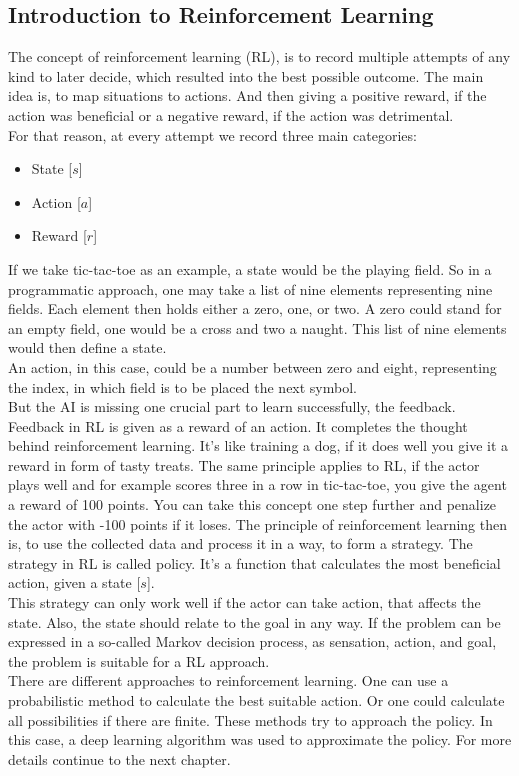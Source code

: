 \documentclass[12pt]{article}
\begin{document}
\subsection{Introduction to Reinforcement Learning}
The concept of \gls{reinforcement learning} (RL), is to record multiple attempts of any kind to later decide, which resulted into the best possible outcome. The main idea is, to map situations to actions. And then giving a positive \gls{reward}, if the action was beneficial or a negative \gls{reward}, if the action was detrimental. \cite{suttonreinforcement} \\
For that reason, at every attempt we record three main categories: 
\begin{itemize}
    \item State [$s$]
    \item Action [$a$]
    \item Reward [$r$]
\end{itemize}
If we take tic-tac-toe as an example, a \gls{state} would be the playing field. So in a programmatic approach, one may take a list of nine elements representing nine fields. Each element then holds either a zero, one, or two. A zero could stand for an empty field, one would be a cross and two a naught. This list of nine elements would then define a \gls{state}. \\
An action, in this case, could be a number between zero and eight, representing the index, in which field is to be placed the next symbol.\\
But the \gls{AI} is missing one crucial part to learn successfully, the feedback. Feedback in RL is given as a \gls{reward} of an action. It completes the thought behind reinforcement learning. It's like training a dog, if it does well you give it a \gls{reward} in form of tasty treats. The same principle applies to RL, if the actor plays well and for example scores three in a row in tic-tac-toe, you give the agent a \gls{reward} of 100 points. You can take this concept one step further and penalize the actor with -100 points if it loses. The principle of \gls{reinforcement learning} then is, to use the collected data and process it in a way, to form a strategy. The strategy in RL is called \gls{policy}. It's a function that calculates the most beneficial action, given a \gls{state} [$s$]. \cite{rl_tictactoe} \\
This strategy can only work well if the actor can take action, that affects the \gls{state}. Also, the \gls{state} should relate to the goal in any way. If the problem can be expressed in a so-called \gls{Markov decision process}, as sensation, action, and goal, the problem is suitable for a RL approach.
\cite{suttonreinforcement} \\
There are different approaches to \gls{reinforcement learning}. One can use a probabilistic method to calculate the best suitable action. Or one could calculate all possibilities if there are finite. These methods try to approach the \gls{policy}. In this case, a \gls{deep learning} algorithm was used to approximate the \gls{policy}. For more details continue to the next chapter.
\cite{rl_overview}
\end{document}
